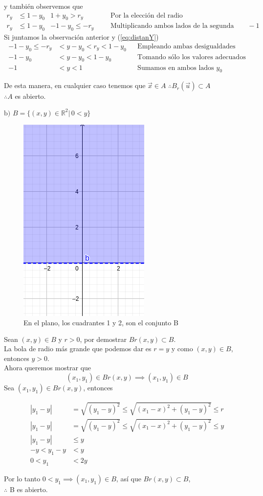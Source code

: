 \documentclass[letterpaper]{article}
\providecommand{\abs}[1]{\left|#1\right|}
\renewcommand{\*}{\cdot}
\theoremstyle{definition}
\begin{document}
y también observemos que
\begin{align*}
	r_y &\leq 1 - y_0  &1 + y_0 > r_y &&&\text{Por la elección del radio}\\
	r_y &\leq 1 - y_0  &-1 - y_0 \leq -r_y &&&\text{Multiplicando ambos lados de la segunda desigualdad por }-1
\end{align*}
Si juntamos la observación anterior y (\ref{eq:distanY})
\begin{align*}
	-1 - y_0 \leq -r_y &< y - y_0 < r_y < 1 - y_0 &&\text{Empleando ambas desigualdades}\\
	-1 - y_0 &< y - y_0 < 1 - y_0 &&\text{Tomando sólo los valores adecuados}\\
	-1 &< y < 1 &&\text{Sumamos en ambos lados  } y_0
\end{align*}
\begin{center}
De esta manera, en cualquier caso tenemos que $ \vec{x} \in A $  $\therefore B_r(\vec{u})\subset A $\\
$ \therefore A $ es abierto.	
\end{center}

%
%
\noindent$\text{b) }B = \{ (x,y) \in \mathbb{R}^2 \vert \,  0 < y  \}$
\begin{figure}[h]
	\centering
	\includegraphics[height=0.3\textwidth]{1b}
	\caption{En el plano, los cuadrantes 1 y 2, son el conjunto B}
\end{figure}
Sean $ (x,y) \in B $ y $r >0 $, por demostrar $ Br(x,y) \subset B $.\\
La bola de radio más grande que podemos dar es $ r = y $ y como $ (x,y) \in B $, entonces $ y>0 $.\\
Ahora queremos mostrar que
\[ (x_1,y_1)\in Br(x,y) \implies (x_1,y_1)\in B \]  
Sea $ (x_1, y_1)\in Br(x,y) $, entonces

\begin{align*}
	\abs{y_1 - y} &= \sqrt{(y_1 -y)^2} \leq \sqrt{(x_1 - x)^2 + (y_1 - y)^2} \leq r\\
	\abs{y_1 - y} &= \sqrt{(y_1 -y)^2} \leq \sqrt{(x_1 - x)^2 + (y_1 - y)^2} \leq y\\
	\abs{y_1 - y} &\leq y\\
	-y<y_1 - y &< y\\
	0<y_1  &< 2y
\end{align*}
\begin{center}
Por lo tanto $  0< y_1 \implies (x_1, y_1) \in B$, así que $ Br(x,y) \subset B $, \\$ \therefore  $ B es abierto.
\end{center}
\end{document}
